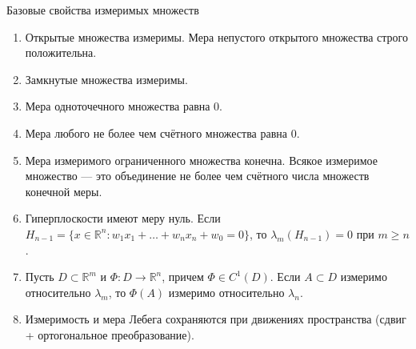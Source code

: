\documentclass[12pt,a4paper]{article}
\begin{document}
\begin{Theorem}{Базовые свойства измеримых множеств}{}
\begin{enumerate}
    \item Открытые множества измеримы. Мера непустого открытого множества строго положительна.
    \item Замкнутые множества измеримы.
    \item Мера одноточечного множества равна 0.
    \item Мера любого не более чем счётного множества равна 0.
    \item Мера измеримого ограниченного множества конечна. Всякое измеримое множество — это объединение не более чем счётного числа множеств конечной меры.
    \item Гиперплоскости имеют меру нуль. Если $H_{n-1} = \{ x \in \mathbb{R}^n : w_1 x_1 + \dots + w_n x_n + w_0 = 0 \}$, то $\lambda_m(H_{n-1}) = 0$ при $m \ge n$.
    \item Пусть $D \subset \mathbb{R}^m$ и $\Phi: D \to \mathbb{R}^n$, причем $\Phi \in C^1(D)$. Если $A \subset D$ измеримо относительно $\lambda_m$, то $\Phi(A)$ измеримо относительно $\lambda_n$.
    \item Измеримость и мера Лебега сохраняются при движениях пространства (сдвиг + ортогональное преобразование).
\end{enumerate}
\end{Theorem}
\end{document}
